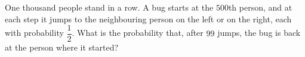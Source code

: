 One thousand people stand in a row. A bug starts at the $500$th person, and at each step it jumps to the neighbouring person on the left or on the right, each with probability $\dfrac{1}{2}$. What is the probability that, after $99$ jumps, the bug is back at the person where it started?
